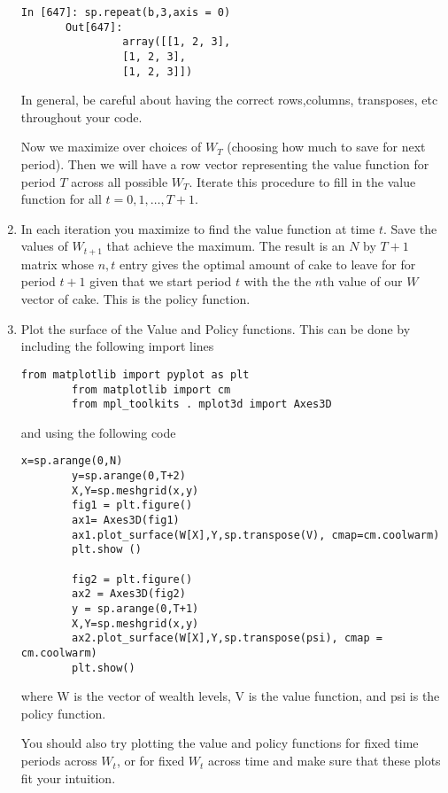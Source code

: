 \begin{problem}
\begin{enumerate}
\begin{lstlisting}[style = python]
       In [647]: sp.repeat(b,3,axis = 0)
       Out[647]:
                array([[1, 2, 3],
                [1, 2, 3],
                [1, 2, 3]])
       \end{lstlisting}
        
       In general, be careful about having the correct rows,columns, transposes, etc throughout your code. 
       
       Now we maximize over choices of $W_T$ (choosing how much to save for next period).  Then we will have a row vector representing the value function for period $T$ across all possible $W_T$.  Iterate this procedure to fill in the value function for all $t=0,1,\ldots, T+1$.

   \item In each iteration you maximize to find the value function at time $t$.  Save the values of $W_{t+1}$ that achieve the maximum.  The result is an $N$ by $T+1$ matrix whose $n,t$ entry gives the optimal amount of cake to leave for for period $t+1$ given that we start period $t$ with the the $n$th value of our $W$ vector of cake.  This is the policy function.

   \item Plot the surface of the Value and Policy functions.  This can be done by including the following import lines
        
        \begin{lstlisting}[style = python]
        from matplotlib import pyplot as plt
        from matplotlib import cm
        from mpl_toolkits . mplot3d import Axes3D
        \end{lstlisting}
        
        and using the following code
          
        \begin{lstlisting}[style = python]
        x=sp.arange(0,N)
        y=sp.arange(0,T+2)
        X,Y=sp.meshgrid(x,y)
        fig1 = plt.figure()
        ax1= Axes3D(fig1)
        ax1.plot_surface(W[X],Y,sp.transpose(V), cmap=cm.coolwarm)
        plt.show ()

        fig2 = plt.figure()
        ax2 = Axes3D(fig2)
        y = sp.arange(0,T+1)
        X,Y=sp.meshgrid(x,y)
        ax2.plot_surface(W[X],Y,sp.transpose(psi), cmap = cm.coolwarm)
        plt.show()
        \end{lstlisting}

        where W is the vector of wealth levels, V is the value function, and psi is the policy function.
          
        You should also try plotting the value and policy functions for fixed time periods across $W_t$, or for fixed $W_t$ across time and make sure that these plots fit your intuition.

\end{enumerate}
\end{problem}

